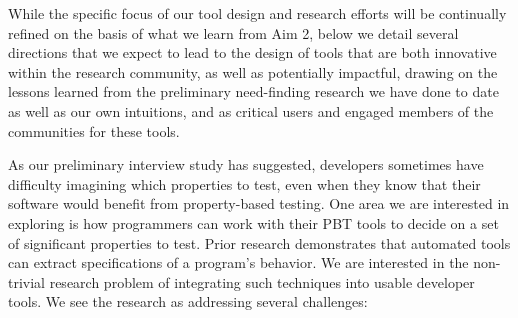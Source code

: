 While the specific focus of our tool design and research efforts will be
continually refined on the basis of what we learn from Aim 2, below we detail
several directions that we expect to lead to the design of tools that are both
innovative within the research community, as well as potentially impactful,
drawing on the lessons learned from the preliminary need-finding research we
have done to date as well as our own intuitions, and as critical users and
engaged members of the communities for these tools.




As our preliminary interview study has suggested, developers sometimes have difficulty imagining which properties to test, even when they know that their software would benefit from property-based testing. One area we are interested in exploring is how programmers can work with their PBT tools to decide on a set of significant properties to test.
Prior research demonstrates that automated tools can extract specifications of a program's behavior\cite{ammons2002mining,le2018deep,claessen2010quickspec}. We are interested in the non-trivial research problem of integrating such techniques into usable developer tools. We see the research as addressing several challenges:

